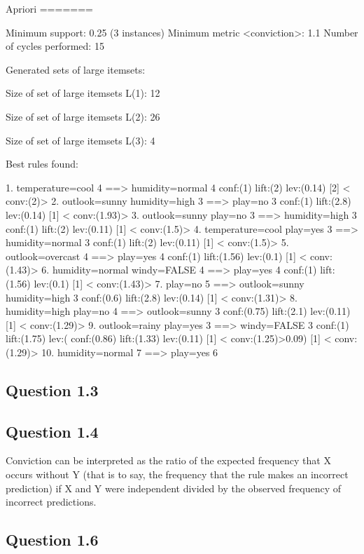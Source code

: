 \documentclass[a4paper,12pt]{article}
\begin{document}
Apriori
=======

Minimum support: 0.25 (3 instances)
Minimum metric <conviction>: 1.1
Number of cycles performed: 15

Generated sets of large itemsets:

Size of set of large itemsets L(1): 12

Size of set of large itemsets L(2): 26

Size of set of large itemsets L(3): 4

Best rules found:

 1. temperature=cool 4 ==> humidity=normal 4    conf:(1) lift:(2) lev:(0.14) [2] < conv:(2)>
 2. outlook=sunny humidity=high 3 ==> play=no 3    conf:(1) lift:(2.8) lev:(0.14) [1] < conv:(1.93)>
 3. outlook=sunny play=no 3 ==> humidity=high 3    conf:(1) lift:(2) lev:(0.11) [1] < conv:(1.5)>
 4. temperature=cool play=yes 3 ==> humidity=normal 3    conf:(1) lift:(2) lev:(0.11) [1] < conv:(1.5)>
 5. outlook=overcast 4 ==> play=yes 4    conf:(1) lift:(1.56) lev:(0.1) [1] < conv:(1.43)>
 6. humidity=normal windy=FALSE 4 ==> play=yes 4    conf:(1) lift:(1.56) lev:(0.1) [1] < conv:(1.43)>
 7. play=no 5 ==> outlook=sunny humidity=high 3    conf:(0.6) lift:(2.8) lev:(0.14) [1] < conv:(1.31)>
 8. humidity=high play=no 4 ==> outlook=sunny 3    conf:(0.75) lift:(2.1) lev:(0.11) [1] < conv:(1.29)>
 9. outlook=rainy play=yes 3 ==> windy=FALSE 3    conf:(1) lift:(1.75) lev:(    conf:(0.86) lift:(1.33) lev:(0.11) [1] < conv:(1.25)>0.09) [1] < conv:(1.29)>
10. humidity=normal 7 ==> play=yes 6


\subsection*{Question 1.3}



\subsection*{Question 1.4}

Conviction can be interpreted as the ratio of the expected frequency that X occurs without Y (that is to say, the frequency that the rule makes an incorrect prediction) if X and Y were independent divided by the observed frequency of incorrect predictions.


\subsection*{Question 1.6}
\end{document}
